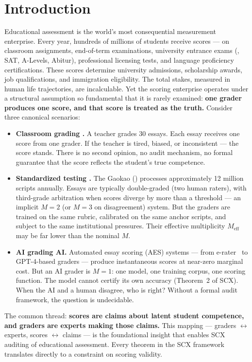 \documentclass[11pt,a4paper]{article}
\theoremstyle{definition}
\theoremstyle{remark}
\newcommand{\SCX}{\textsc{SCX}}
\begin{document}
\section{Introduction}
Educational assessment is the world's most consequential measurement enterprise. Every year, hundreds of millions of students receive scores — on classroom assignments, end-of-term examinations, university entrance exams (, SAT, A-Levels, Abitur), professional licensing tests, and language proficiency certifications. These scores determine university admissions, scholarship awards, job qualifications, and immigration eligibility. The total stakes, measured in human life trajectories, are incalculable.
Yet the scoring enterprise operates under a structural assumption so fundamental that it is rarely examined: \textbf{one grader produces one score, and that score is treated as the truth.}
Consider three canonical scenarios:
\begin{itemize}[nosep]
    \item \textbf{Classroom grading .} A teacher grades 30 essays. Each essay receives one score from one grader. If the teacher is tired, biased, or inconsistent — the score stands. There is no second opinion, no audit mechanism, no formal guarantee that the score reflects the student's true competence.
    \item \textbf{Standardized testing .} The Gaokao () processes approximately 12 million scripts annually. Essays are typically double-graded (two human raters), with third-grade arbitration when scores diverge by more than a threshold — an implicit $M=2$ (or $M=3$ on disagreement) system. But the graders are trained on the same rubric, calibrated on the same anchor scripts, and subject to the same institutional pressures. Their effective multiplicity $M_{\text{eff}}$ may be far lower than the nominal $M$.
    \item \textbf{AI grading AI.} Automated essay scoring (AES) systems — from e-rater~\cite{AttaliBurstein2006} to GPT-4-based graders — produce instantaneous scores at near-zero marginal cost. But an AI grader is $M=1$: one model, one training corpus, one scoring function. The model cannot certify its own accuracy (Theorem~2 of \SCX{}). When the AI and a human disagree, who is right? Without a formal audit framework, the question is undecidable.
\end{itemize}
The common thread: \textbf{scores are claims about latent student competence, and graders are experts making those claims.} This mapping — graders $\leftrightarrow$ experts, scores $\leftrightarrow$ claims — is the foundational insight that enables \SCX{} auditing of educational assessment. Every theorem in the \SCX{} framework translates directly to a constraint on scoring validity.
\end{document}
